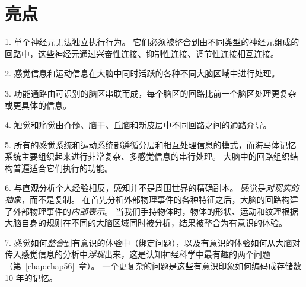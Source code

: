 \section{亮点}

1. 单个神经元无法独立执行行为。
它们必须被整合到由不同类型的神经元组成的回路中，这些神经元通过兴奋性连接、抑制性连接、调节性连接相互连接。


2. 感觉信息和运动信息在大脑中同时活跃的各种不同大脑区域中进行处理。


3. 功能通路由可识别的脑区串联而成，每个脑区的回路比前一个脑区处理更复杂或更具体的信息。


4. 触觉和痛觉由脊髓、脑干、丘脑和新皮层中不同回路之间的通路介导。


5. 所有的感觉系统和运动系统都遵循分层和相互处理信息的模式，而海马体记忆系统主要组织起来进行非常复杂、多感觉信息的串行处理。
大脑中的回路组织结构普遍适合它们执行的功能。


6. 与直观分析个人经验相反，感知并不是周围世界的精确副本。
感觉是\textit{对现实的抽象}，而不是复制。
在首先分析外部物理事件的各种特征之后，大脑的回路构建了外部物理事件的\textit{内部表示}。
当我们手持物体时，物体的形状、运动和纹理根据大脑自身的规则在不同的大脑区域同时被分析，结果被整合为有意识的体验。


7. 感觉如何\textit{整合}到有意识的体验中（绑定问题），以及有意识的体验如何从大脑对传入感觉信息的分析中\textit{浮现}出来，这是认知神经科学中最有趣的两个问题（第~\ref{chap:chap56}~章）。
一个更复杂的问题是这些有意识印象如何编码成存储数 10 年的记忆。
























